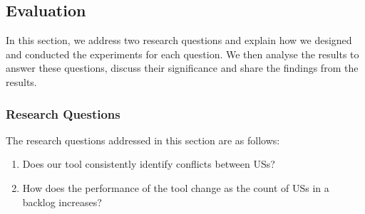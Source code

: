\subsection{Evaluation}\label{conflict_evaluation}
In this section, we address two research questions and explain how we designed and conducted the experiments for each question. We then analyse the results to answer these questions, discuss their significance and share the findings from the results.
\subsubsection*{Research Questions}
The research questions addressed in this section are as follows:
\begin{enumerate}
	\item Does our tool consistently identify conflicts between USs?
	\item How does the performance of the tool change as the count of USs in a backlog increases?
	\end{enumerate}
